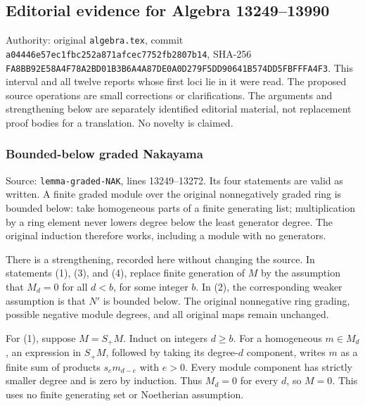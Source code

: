 \subsection{Editorial evidence for Algebra 13249--13990}\label{algebra-proof-002-editorial-evidence-for-algebra-1324913990}

Authority: original \texttt{algebra.tex}, commit \texttt{a044\allowbreak{}46e5\allowbreak{}7ec1\allowbreak{}fbc2\allowbreak{}52a8\allowbreak{}71af\allowbreak{}cec7\allowbreak{}752f\allowbreak{}b280\allowbreak{}7b14}, SHA-256 \texttt{FA8B\allowbreak{}B92E\allowbreak{}58A4\allowbreak{}F78A\allowbreak{}2BD0\allowbreak{}1B3B\allowbreak{}6A4A\allowbreak{}87DE\allowbreak{}0A0D\allowbreak{}279F\allowbreak{}5DD9\allowbreak{}0641\allowbreak{}B574\allowbreak{}DD5F\allowbreak{}BFFF\allowbreak{}A4F3}. This interval and all twelve reports whose first loci lie in it were read. The proposed source operations are small corrections or clarifications. The arguments and strengthening below are separately identified editorial material, not replacement proof bodies for a translation. No novelty is claimed.

\subsubsection{Bounded-below graded Nakayama}\label{algebra-proof-002-bounded-below-graded-nakayama}

Source: \texttt{lemma-\AlgebraIdentifierBreak{}graded-\AlgebraIdentifierBreak{}NAK}, lines 13249--13272. Its four statements are valid as written. A finite graded module over the original nonnegatively graded ring is bounded below: take homogeneous parts of a finite generating list; multiplication by a ring element never lowers degree below the least generator degree. The original induction therefore works, including a module with no generators.

There is a strengthening, recorded here without changing the source. In statements (1), (3), and (4), replace finite generation of \(M\) by the assumption that \(M_d=0\) for all \(d<b\), for some integer \(b\). In (2), the corresponding weaker assumption is that \(N'\) is bounded below. The original nonnegative ring grading, possible negative module degrees, and all original maps remain unchanged.

For (1), suppose \(M=S_+M\). Induct on integers \(d\geq b\). For a homogeneous \(m\in M_d\), an expression in \(S_+M\), followed by taking its degree-\(d\) component, writes \(m\) as a finite sum of products \(s_e m_{d-e}\) with \(e>0\). Every module component has strictly smaller degree and is zero by induction. Thus \(M_d=0\) for every \(d\), so \(M=0\). This uses no finite generating set or Noetherian assumption.

